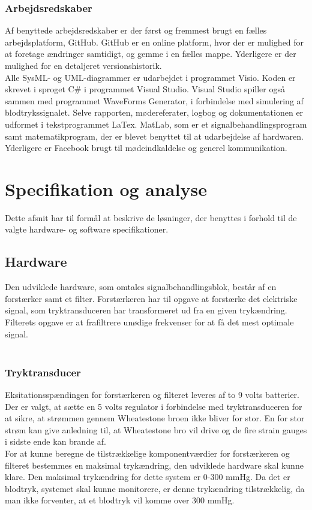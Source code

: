 \subsubsection{Arbejdsredskaber} 
Af benyttede arbejdsredskaber er der først og fremmest brugt en fælles arbejdsplatform, GitHub. GitHub er en online platform, hvor der er mulighed for at foretage ændringer samtidigt, og gemme i en fælles mappe. Yderligere er der mulighed for en detaljeret versionshistorik.\\
Alle SysML- og UML-diagrammer er udarbejdet i programmet Visio. Koden er skrevet i sproget C\# i programmet Visual Studio. Visual Studio spiller også sammen med programmet WaveForms Generator, i forbindelse med simulering af blodtrykssignalet. Selve rapporten, mødereferater, logbog og dokumentationen er udformet i tekstprogrammet LaTex. MatLab, som er et signalbehandlingsprogram samt matematikprogram, der er blevet benyttet til at udarbejdelse af hardwaren. Yderligere er Facebook brugt til mødeindkaldelse og generel kommunikation.



\section{Specifikation og analyse}
Dette afsnit har til formål at beskrive de løsninger, der benyttes i forhold til de valgte hardware- og software specifikationer. 

\subsection{Hardware}
Den udviklede hardware, som omtales signalbehandlingsblok, består af en forstærker samt et filter. Forstærkeren har til opgave at forstærke det elektriske signal, som tryktransduceren har transformeret ud fra en given trykændring. Filterets opgave er at frafiltrere unødige frekvenser for at få det mest optimale signal.
\\\\
\subsubsection{Tryktransducer}
Eksitationsspændingen for forstærkeren og filteret leveres af to 9 volts batterier. Der er valgt, at sætte en 5 volts regulator i forbindelse med tryktransduceren for at sikre, at strømmen gennem Wheatestone broen ikke bliver for stor. En for stor strøm kan give anledning til, at Wheatestone bro vil drive og de fire strain gauges i sidste ende kan brande af.\\
For at kunne beregne de tilstrækkelige komponentværdier for forstærkeren og filteret bestemmes en maksimal trykændring, den udviklede hardware skal kunne klare. Den maksimal trykændring for dette system er 0-300 mmHg. Da det er blodtryk, systemet skal kunne monitorere, er denne trykændring tilstrækkelig, da man ikke forventer, at et blodtryk vil komme over 300 mmHg.

